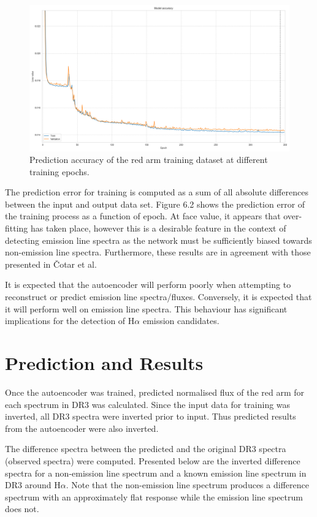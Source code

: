 \begin{figure}[!htb]
\centering
\includegraphics[scale=0.38]{figures/ann_network_loss.png}
\caption{Prediction accuracy of the red arm training dataset at different training epochs.}
\end{figure}

The prediction error for training is computed as a sum of all absolute differences between the input and output data set. Figure 6.2 shows the prediction error of the training process as a function of epoch. At face value, it appears that over-fitting has taken place, however this is a desirable feature in the context of detecting emission line spectra as the network must be sufficiently biased towards non-emission line spectra. Furthermore, these results are in agreement with those presented in Čotar et al.

It is expected that the autoencoder will perform poorly when attempting to reconstruct or predict emission line spectra/fluxes. Conversely, it is expected that it will perform well on emission line spectra. This behaviour has significant implications for the detection of H$\alpha$ emission candidates.

\section{Prediction and Results}

Once the autoencoder was trained, predicted normalised flux of the red arm for each spectrum in DR3 was calculated. Since the input data for training was inverted, all DR3 spectra were inverted prior to input. Thus predicted results from the autoencoder were also inverted.

The difference spectra between the predicted and the original DR3 spectra (observed spectra) were computed. Presented below are the inverted difference spectra for a non-emission line spectrum and a known emission line spectrum in DR3 around H$\alpha$. Note that the non-emission line spectrum produces a difference spectrum with an approximately flat response while the emission line spectrum does not. 


